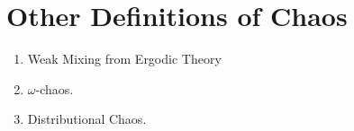 \documentclass[12pt,twoside,draft]{book}
\begin{document}
\chapter{Other Definitions of Chaos}
\begin{enumerate}
  \item Weak Mixing from Ergodic Theory
  \item $\omega$-chaos\citep{omegachaos}.
  \item Distributional Chaos\citep{dchaos1}\citep{dchaos2}.
\end{enumerate}




\printindex
\end{document}
